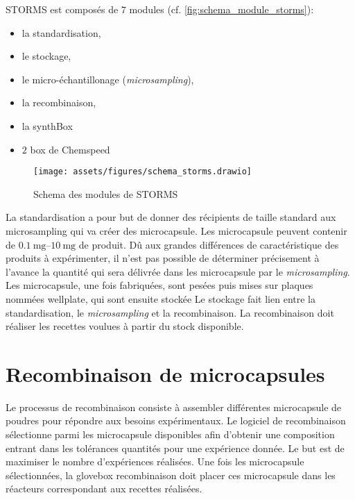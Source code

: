 STORMS est composés de $7$ modules (cf. \autoref{fig:schema_module_storms}):
\begin{itemize}
    \item la standardisation,
    \item le stockage,
    \item le micro-échantillonage (\textit{microsampling}),
    \item la recombinaison,
    \item la synthBox
    \item $2$ box de Chemspeed
\end{itemize}
\begin{figure}[h]
    \centering
    \texttt{[image: assets/figures/schema\_storms.drawio]}
    \caption{Schema des modules de STORMS}
    \label{fig:schema_module_storms}
\end{figure}
La standardisation a pour but de donner des récipients de taille standard aux microsampling qui va créer des \gls{microcapsule}.
Les \gls{microcapsule} peuvent contenir de $\qtyrange[range-units=single]{0.1}{10}{\mg}$ de produit. Dû aux grandes différences de caractéristique des produits à expérimenter, il n'est pas possible de déterminer précisement à l'avance la quantité qui sera délivrée dans les \gls{microcapsule} par le \textit{microsampling}.
Les \gls{microcapsule}, une fois fabriquées, sont pesées puis mises sur plaques nommées \gls{wellplate}, qui sont ensuite stockée Le stockage fait lien entre la standardisation, le \textit{microsampling} et la recombinaison.
La recombinaison doit réaliser les recettes voulues à partir du stock disponible.

\section{Recombinaison de microcapsules}
Le processus de recombinaison consiste à assembler différentes \gls{microcapsule} de poudres pour répondre aux besoins expérimentaux. Le logiciel de recombinaison sélectionne parmi les \gls{microcapsule} disponibles afin d'obtenir une composition entrant dans les tolérances quantités pour une expérience donnée. Le but est de maximiser le nombre d'expériences réalisées. Une fois les \gls{microcapsule} sélectionnées, la \gls{glovebox} recombinaison doit placer ces \gls{microcapsule} dans les réacteurs correspondant aux recettes réalisées.